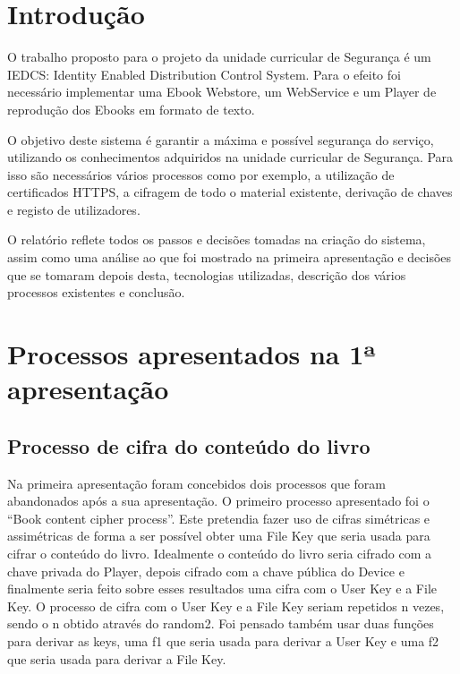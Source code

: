 \documentclass[pdftex,12pt,a4paper]{report}
\begin{document}
\renewcommand{\headrulewidth}{0pt}

\fancyhead{}
\fancyfoot{}
\rfoot{\thepage}

\renewcommand*\contentsname{Conteúdos}
\renewcommand*\figurename{Figura}
\renewcommand*\tablename{Tabela}

\tableofcontents
\renewcommand{\headrulewidth}{0.15pt}
\renewcommand{\thechapter}{}


\clearpage

\section{Introdução}
O trabalho proposto para o projeto da unidade curricular de Segurança é um IEDCS: Identity Enabled Distribution Control System. Para o  efeito foi necessário implementar uma Ebook Webstore, um WebService e um Player de reprodução dos Ebooks em formato de texto.

O objetivo deste sistema é garantir a máxima e possível segurança do serviço, utilizando os conhecimentos adquiridos na unidade curricular de Segurança. Para isso são necessários vários processos como por exemplo, a utilização de certificados HTTPS, a cifragem de todo o material existente, derivação de chaves e registo de utilizadores.	

O relatório reflete todos os passos e decisões tomadas na criação do sistema, assim como uma análise ao que foi mostrado na primeira apresentação e decisões que se tomaram depois desta, tecnologias utilizadas, descrição dos vários processos existentes e conclusão.

\newpage
\section{Processos apresentados na 1ª apresentação}

\subsection{Processo de cifra do conteúdo do livro}
Na primeira apresentação foram concebidos dois processos que foram abandonados após a sua apresentação. O primeiro processo apresentado foi o “Book content cipher process”. Este pretendia fazer uso de cifras simétricas e assimétricas de forma a ser possível obter uma File Key que seria usada para cifrar o conteúdo do livro. Idealmente o conteúdo do livro seria cifrado com a chave privada do Player, depois cifrado com a chave pública do Device e finalmente seria feito sobre esses resultados uma cifra com o User Key e a File Key. O processo de cifra com o User Key e a File Key seriam repetidos n vezes, sendo o n obtido através do random2. Foi pensado também usar duas funções para derivar as keys, uma f1 que seria usada para derivar a User Key e uma f2 que seria usada para derivar a File Key.
\end{document}
